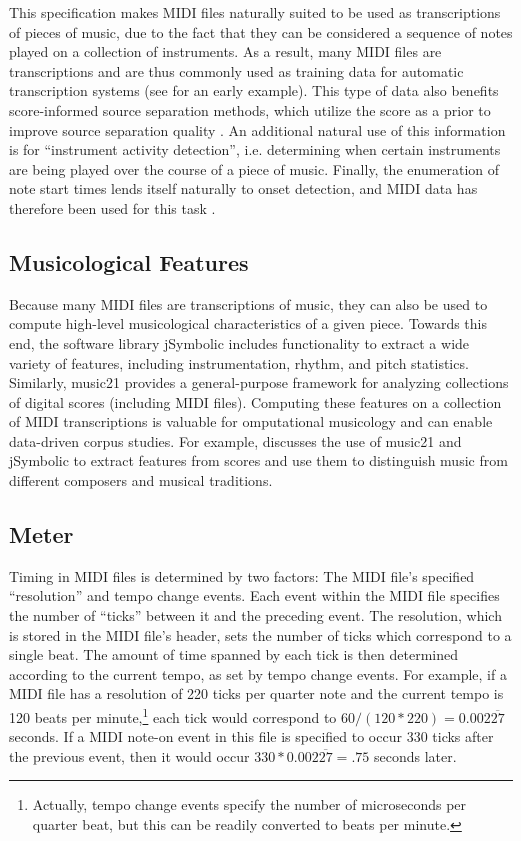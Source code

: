 \documentclass{article}
\begin{document}
This specification makes MIDI files naturally suited to be used as transcriptions of pieces of music, due to the fact that they can be considered a sequence of notes played on a collection of instruments.
As a result, many MIDI files are transcriptions and are thus commonly used as training data for automatic transcription systems (see \cite{turetsky2003ground} for an early example).
This type of data also benefits score-informed source separation methods, which utilize the score as a prior to improve source separation quality \cite{ewert2014score}.
An additional natural use of this information is for ``instrument activity detection'', i.e. determining when certain instruments are being played over the course of a piece of music.
Finally, the enumeration of note start times lends itself naturally to onset detection, and MIDI data has therefore been used for this task \cite{bello2005tutorial}.

\subsection{Musicological Features}

Because many MIDI files are transcriptions of music, they can also be used to compute high-level musicological characteristics of a given piece.
Towards this end, the software library jSymbolic \cite{mckay2006jsymbolic} includes functionality to extract a wide variety of features, including instrumentation, rhythm, and pitch statistics.
Similarly, music21 \cite{cuthbert2010music21} provides a general-purpose framework for analyzing collections of digital scores (including MIDI files).
Computing these features on a collection of MIDI transcriptions is valuable for omputational musicology and can enable data-driven corpus studies.
For example, \cite{cuthbert2011feature} discusses the use of music21 and jSymbolic to extract features from scores and use them to distinguish music from different composers and musical traditions.

\subsection{Meter}

Timing in MIDI files is determined by two factors: The MIDI file's specified ``resolution'' and tempo change events.
Each event within the MIDI file specifies the number of ``ticks'' between it and the preceding event.
The resolution, which is stored in the MIDI file's header, sets the number of ticks which correspond to a single beat.
The amount of time spanned by each tick is then determined according to the current tempo, as set by tempo change events.
For example, if a MIDI file has a resolution of 220 ticks per quarter note and the current tempo is 120 beats per minute,\footnote{Actually, tempo change events specify the number of microseconds per quarter beat, but this can be readily converted to beats per minute.} each tick would correspond to $60/(120*220) = 0.002\overline{27}$ seconds.
If a MIDI note-on event in this file is specified to occur 330 ticks after the previous event, then it would occur $330*0.002\overline{27} = .75$ seconds later.
\end{document}
